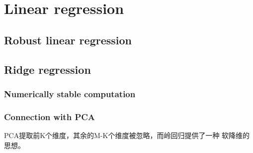 \chapter{Linear regression}
\section{Robust linear regression}
\section{Ridge regression}
\subsection{Numerically stable computation}
\subsection{Connection with PCA}
PCA提取前K个维度，其余的M-K个维度被忽略，而岭回归提供了一种
软降维的思想。
